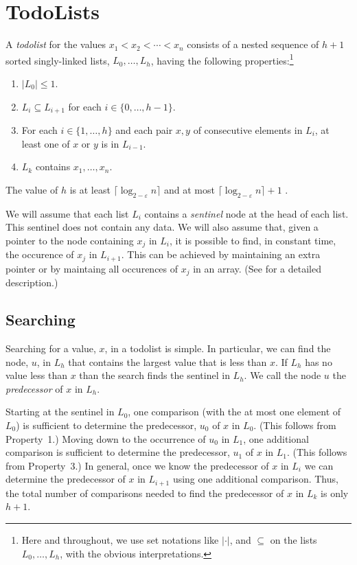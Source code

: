 \documentclass[lotsofwhite]{patmorin}
\begin{document}
\section{TodoLists}

A \emph{todolist} for the values $x_1<x_2<\cdots<x_n$ consists of a
nested sequence of $h+1$ sorted singly-linked lists, $L_0,\ldots,L_h$,
having the following properties:\footnote{Here and throughout, we use set
notations like $|\cdot|$, and $\subseteq$ on the lists $L_0,\ldots,L_h$,
with the obvious interpretations.}

\begin{enumerate}
\item $|L_0| \le 1$.
\item $L_i\subseteq L_{i+1}$ for each $i\in\{0,\ldots,h-1\}$.
\item For each $i\in\{1,\ldots,h\}$ and each pair $x,y$ of consecutive elements in $L_i$, at least one of $x$ or $y$ is in $L_{i-1}$.
\item $L_k$ contains $x_1,\ldots,x_n$.
\end{enumerate}

The value of $h$ is at least $\lceil \log_{2-\varepsilon} n\rceil$ and at most
$\lceil \log_{2-\varepsilon} n\rceil+1$ .

We will assume that each list $L_i$ contains a \emph{sentinel} node
at the head of each list. This sentinel does not contain any data.
We will also assume that, given a pointer to the node containing $x_j$
in $L_i$, it is possible to find, in constant time, the occurence of $x_j$
in $L_{i+1}$.  This can be achieved by maintaining an extra pointer or by
maintaing all occurences of $x_j$ in an array. (See 
for a detailed description.)

\subsection{Searching}

Searching for a value, $x$, in a todolist is simple. In particular, we
can find the node, $u$, in $L_h$ that contains the largest value that
is less than $x$. If $L_h$ has no value less than $x$ than the search
finds the sentinel in $L_h$.  We call the node $u$ the \emph{predecessor}
of $x$ in $L_h$.

Starting at the sentinel in $L_0$, one comparison (with the at most one
element of $L_0$) is sufficient to determine the predecessor, $u_0$ of $x$
in $L_0$. (This follows from Property~1.)  Moving down to the occurrence
of $u_0$ in $L_1$, one additional comparison is sufficient to determine
the predecessor, $u_1$ of $x$ in $L_1$. (This follows from Property~3.)
In general, once we know the predecessor of $x$ in $L_i$ we can determine
the predecessor of $x$ in $L_{i+1}$ using one additional comparison. Thus,
the total number of comparisons needed to find the predecessor of $x$
in $L_k$ is only $h+1$.
\end{document}
